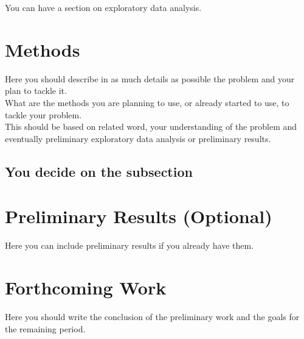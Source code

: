 \documentclass[sigplan]{acmart}
\begin{document}
You can have a section on exploratory data analysis. \\

\section{Methods} \label{sec:methods}

Here you should describe in as much details as possible the problem and your plan to tackle it. \\

What are the methods you are planning to use, or already started to use, to tackle your problem. \\

This should be based on related word, your understanding of the problem and eventually preliminary exploratory data analysis or preliminary results.

\subsection{You decide on the subsection} 

\section{Preliminary Results (Optional)} \label{sec:preliminaryresults}

Here you can include preliminary results if you already have them.


\section{Forthcoming Work} \label{sec:forthcomingwork}

Here you should write the conclusion of the preliminary work and the goals for the remaining period.




\end{document}
